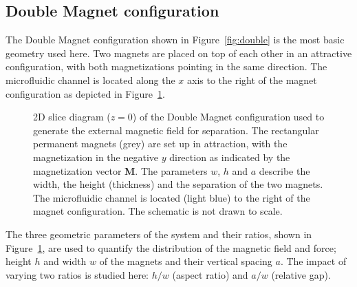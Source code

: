 \subsection{Double Magnet configuration}\label{subsec:doubleMagnetConfiguration}
The Double Magnet configuration shown in Figure~\ref{fig:double} is the most basic geometry used here. Two magnets are placed on top of each other in an attractive configuration, with both magnetizations pointing in the same direction. The microfluidic channel is located along the $x$ axis to the right of the magnet configuration as depicted in Figure~\ref{fig:doubleMagnetConfigurationSchematic}. 
\begin{figure}[htb]
\centering
{}
\caption[2D diagram of the Double Magnet configuration]{2D slice diagram ($z=0$) of the Double Magnet configuration used to generate the external magnetic field for separation. The rectangular permanent magnets (grey) are set up in attraction, with the magnetization in the negative $y$ direction as indicated by the magnetization vector $\mathbf{M}$. The parameters $w$, $h$ and $a$ describe the width, the height (thickness) and the separation of the two magnets. The microfluidic channel is located (light blue) to the right of the magnet configuration. The schematic is not drawn to scale.}
\label{fig:doubleMagnetConfigurationSchematic}
\end{figure}
The three geometric parameters of the system and their ratios, shown in Figure~\ref{fig:doubleMagnetConfigurationSchematic}, are used to quantify the distribution of the magnetic field and force; height $h$ and width $w$ of the magnets and their vertical spacing $a$. The impact of varying two ratios is studied here: $h/w$ (aspect ratio) and $a/w$ (relative gap).

